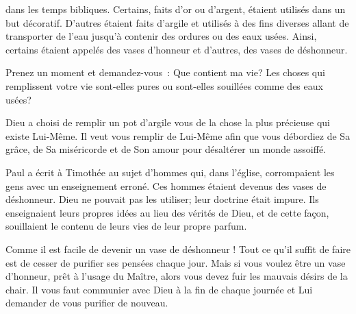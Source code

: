 
 dans les temps bibliques.
 Certains, faits d'or ou d'argent, étaient utilisés dans un but décoratif.
 D'autres étaient faits d'argile et utilisés à des fins diverses
 allant de transporter de l'eau jusqu'à contenir des ordures
 ou des eaux usées. Ainsi, certains étaient appelés des vases d'honneur
 et d'autres, des vases de déshonneur.

Prenez un moment et demandez-vous~: 
 \og Que contient ma vie? \fg {}
 Les choses qui remplissent votre vie sont-elles
 pures ou sont-elles souillées comme des eaux usées? 


Dieu a choisi de remplir un pot d'argile \ocadr vous \fcadr{}
 de la chose la plus précieuse qui existe \ocadr Lui-Même.
 Il veut vous remplir de Lui-Même afin que vous débordiez de Sa grâce,
 de Sa miséricorde et de Son amour pour désaltérer un monde assoiffé.

Paul a écrit à Timothée au sujet d'hommes qui, dans l'église,
 corrompaient les gens avec un enseignement erroné.
 Ces hommes étaient devenus des vases de déshonneur.
 Dieu ne pouvait pas les utiliser; leur doctrine était impure.
 Ils enseignaient leurs propres idées au lieu des vérités de Dieu,
 et de cette façon, souillaient le contenu de leurs vies
 de leur propre parfum. 

Comme il est facile de devenir un vase de déshonneur !
 Tout ce qu'il suffit de faire est de cesser de purifier ses pensées
 chaque jour. Mais si vous voulez être un vase d'honneur,
 prêt à l'usage du Maître, alors vous devez fuir les mauvais désirs
 de la chair. Il vous faut communier avec Dieu à la fin de chaque journée
 et Lui demander de vous purifier de nouveau. 

\dvrule






